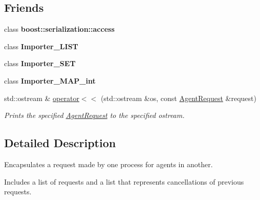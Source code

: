 \subsection*{Friends}
\begin{DoxyCompactItemize}
\item 
\hypertarget{classrepast_1_1_agent_request_ac98d07dd8f7b70e16ccb9a01abf56b9c}{class {\bfseries boost\-::serialization\-::access}}\label{classrepast_1_1_agent_request_ac98d07dd8f7b70e16ccb9a01abf56b9c}

\item 
\hypertarget{classrepast_1_1_agent_request_aa7639ebf76360a6503e77366cc231d8a}{class {\bfseries Importer\-\_\-\-L\-I\-S\-T}}\label{classrepast_1_1_agent_request_aa7639ebf76360a6503e77366cc231d8a}

\item 
\hypertarget{classrepast_1_1_agent_request_a5a13f6efb82ee26ba1a72200d6f2b47e}{class {\bfseries Importer\-\_\-\-S\-E\-T}}\label{classrepast_1_1_agent_request_a5a13f6efb82ee26ba1a72200d6f2b47e}

\item 
\hypertarget{classrepast_1_1_agent_request_af54ef3fa9be752e0bc2e86fc77d58a4c}{class {\bfseries Importer\-\_\-\-M\-A\-P\-\_\-int}}\label{classrepast_1_1_agent_request_af54ef3fa9be752e0bc2e86fc77d58a4c}

\item 
\hypertarget{classrepast_1_1_agent_request_ae9b3dceacb552223daaa71d44018d4b1}{std\-::ostream \& \hyperlink{classrepast_1_1_agent_request_ae9b3dceacb552223daaa71d44018d4b1}{operator$<$$<$} (std\-::ostream \&os, const \hyperlink{classrepast_1_1_agent_request}{Agent\-Request} \&request)}\label{classrepast_1_1_agent_request_ae9b3dceacb552223daaa71d44018d4b1}

\begin{DoxyCompactList}\small\item\em Prints the specified \hyperlink{classrepast_1_1_agent_request}{Agent\-Request} to the specified ostream. \end{DoxyCompactList}\end{DoxyCompactItemize}


\subsection{Detailed Description}
Encapsulates a request made by one process for agents in another. 

Includes a list of requests and a list that represents cancellations of previous requests. 

